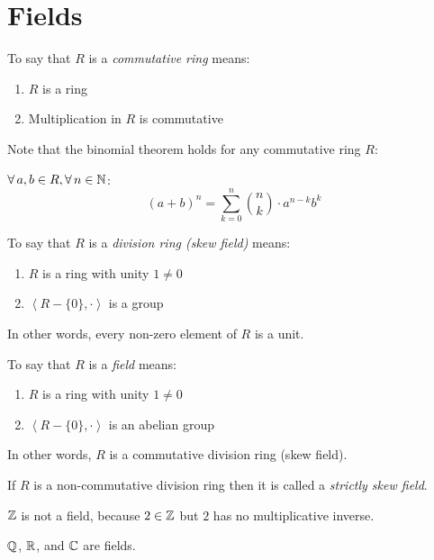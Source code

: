 \documentclass[letterpaper,12pt,fleqn]{article}
\begin{document}
\section*{Fields}

\begin{definition}
  To say that $R$ is a \emph{commutative ring} means:
  \begin{enumerate}
  \item $R$ is a ring
  \item Multiplication in $R$ is commutative
  \end{enumerate}
\end{definition}

Note that the binomial theorem holds for any commutative ring $R$:

$\forall\,a,b\in R,\forall\,n\in\mathbb{N}$:
\[(a+b)^n=\sum_{k=0}^n\binom{n}{k}\cdot a^{n-k}b^k\]

\begin{definition}
  To say that $R$ is a \emph{division ring (skew field)} means:
  \begin{enumerate}
  \item $R$ is a ring with unity $1\ne0$
  \item $\left<R-\{0\},\cdot\right>$ is a group
  \end{enumerate}
  In other words, every non-zero element of $R$ is a unit.
\end{definition}

\begin{definition}
  To say that $R$ is a \emph{field} means:
  \begin{enumerate}
  \item $R$ is a ring with unity $1\ne0$
  \item $\left<R-\{0\},\cdot\right>$ is an abelian group
  \end{enumerate}
  In other words, $R$ is a commutative division ring (skew field).

  If $R$ is a non-commutative division ring then it is called a
  \emph{strictly skew field}.
\end{definition}

\begin{example}
  $\mathbb{Z}$ is not a field, because $2\in\mathbb{Z}$ but $2$ has no multiplicative inverse.

  $\mathbb{Q}$, $\mathbb{R}$, and $\mathbb{C}$ are fields.
\end{example}
\end{document}
